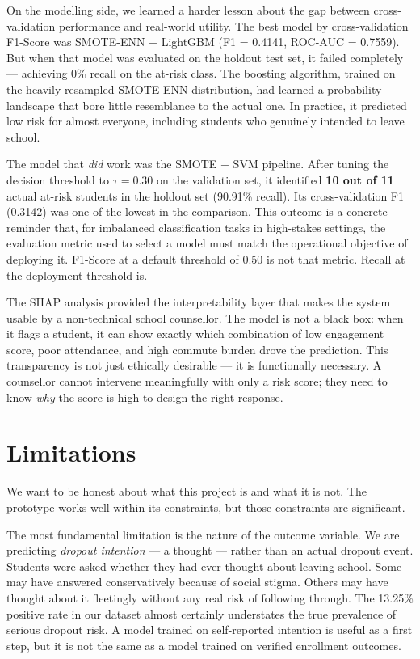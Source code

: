 On the modelling side, we learned a harder lesson about the gap between cross-validation performance and real-world utility. The best model by cross-validation F1-Score was SMOTE-ENN + LightGBM (F1 = 0.4141, ROC-AUC = 0.7559). But when that model was evaluated on the holdout test set, it failed completely --- achieving 0\% recall on the at-risk class. The boosting algorithm, trained on the heavily resampled SMOTE-ENN distribution, had learned a probability landscape that bore little resemblance to the actual one. In practice, it predicted low risk for almost everyone, including students who genuinely intended to leave school.

The model that \textit{did} work was the SMOTE + SVM pipeline. After tuning the decision threshold to $\tau = 0.30$ on the validation set, it identified \textbf{10 out of 11} actual at-risk students in the holdout set (90.91\% recall). Its cross-validation F1 (0.3142) was one of the lowest in the comparison. This outcome is a concrete reminder that, for imbalanced classification tasks in high-stakes settings, the evaluation metric used to select a model must match the operational objective of deploying it. F1-Score at a default threshold of 0.50 is not that metric. Recall at the deployment threshold is.

The SHAP analysis provided the interpretability layer that makes the system usable by a non-technical school counsellor. The model is not a black box: when it flags a student, it can show exactly which combination of low engagement score, poor attendance, and high commute burden drove the prediction. This transparency is not just ethically desirable --- it is functionally necessary. A counsellor cannot intervene meaningfully with only a risk score; they need to know \textit{why} the score is high to design the right response.

\section{Limitations}
\label{sec:limitations}

We want to be honest about what this project is and what it is not. The prototype works well within its constraints, but those constraints are significant.

The most fundamental limitation is the nature of the outcome variable. We are predicting \textit{dropout intention} --- a thought --- rather than an actual dropout event. Students were asked whether they had ever thought about leaving school. Some may have answered conservatively because of social stigma. Others may have thought about it fleetingly without any real risk of following through. The 13.25\% positive rate in our dataset almost certainly understates the true prevalence of serious dropout risk. A model trained on self-reported intention is useful as a first step, but it is not the same as a model trained on verified enrollment outcomes.

